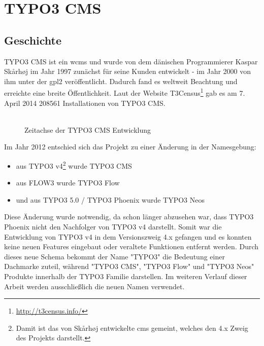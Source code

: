 \section{TYPO3 CMS}
\label{sec:typo3cms}
\subsection{Geschichte}
\label{subsec:historyTypo3}
TYPO3 CMS ist ein \gls{wcms} und wurde von dem dänischen Programmierer Kaspar Skårhøj im Jahr 1997 zunächst für seine Kunden entwickelt - im Jahr 2000 von ihm unter der \gls{gpl2} veröffentlicht. Dadurch fand es weltweit Beachtung und erreichte eine breite Öffentlichkeit. Laut der Website T3Census\footnote{\url{http://t3census.info/}} gab es am 7. April 2014 208561 Installationen von TYPO3 CMS.
\\
\\
\begin{figure}[h!]
	\startchronology[startyear=1995, stopyear=2015]
	\stopchronology
	\caption{Zeitachse der TYPO3 CMS Entwicklung}
\end{figure}

Im Jahr 2012 entschied sich das Projekt zu einer Änderung in der Namesgebung:
\begin{itemize}
	\item aus TYPO3 v4\footnote{Damit ist das von Skårhøj entwickelte \gls{cms} gemeint, welches den 4.x Zweig des Projekts darstellt.} wurde TYPO3 CMS
	\item aus FLOW3 wurde TYPO3 Flow
	\item und aus TYPO3 5.0 / TYPO3 Phoenix wurde TYPO3 Neos
\end{itemize}

Diese Änderung wurde notwendig, da schon länger abzusehen war, dass TYPO3 Phoenix nicht den Nachfolger von TYPO3 v4 darstellt. Somit war die Entwicklung von TYPO3 v4 in dem Versionszweig 4.x gefangen und es konnten keine neuen Features eingebaut oder veraltete Funktionen entfernt werden. Durch dieses neue Schema bekommt der Name "TYPO3" die Bedeutung einer Dachmarke zuteil, während "TYPO3 CMS", "TYPO3 Flow" und "TYPO3 Neos" Produkte innerhalb der TYPO3 Familie darstellen. Im weiteren Verlauf dieser Arbeit werden ausschließlich die neuen Namen verwendet.

